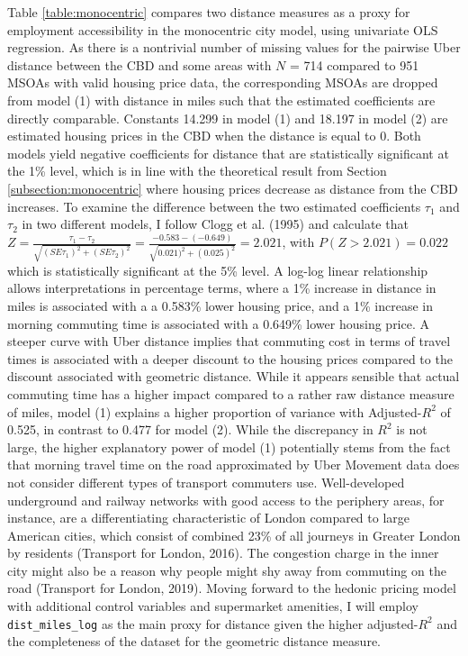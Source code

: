 \documentclass{article}
\begin{document}
Table \ref{table:monocentric} compares two distance measures as a proxy for employment accessibility in the monocentric city model, using univariate OLS regression. As there is a nontrivial number of missing values for the pairwise Uber distance between the CBD and some areas with $N$ = 714 compared to 951 MSOAs with valid housing price data, the corresponding MSOAs are dropped from model (1) with distance in miles such that the estimated coefficients are directly comparable. Constants 14.299 in model (1) and 18.197 in model (2) are estimated housing prices in the CBD when the distance is equal to 0. Both models yield negative coefficients for distance that are statistically significant at the 1\% level, which is in line with the theoretical result from Section \ref{subsection:monocentric} where housing prices decrease as distance from the CBD increases. To examine the difference between the two estimated coefficients $\tau_1$ and $\tau_2$ in two different models, I follow Clogg et al. (1995) and calculate that $Z = \frac{\tau_1 - \tau_2}{\sqrt{(SE\tau_1)^2 + (SE\tau_2)^2}}  = \frac{-0.583 - (-0.649)}{\sqrt{0.021)^2 + (0.025)^2}} = 2.021$, with $P(Z > 2.021) = 0.022$  which is statistically significant at the 5\% level. A log-log linear relationship allows interpretations in percentage terms, where a 1\% increase in distance in miles is associated with a a 0.583\% lower housing price, and a 1\% increase in morning commuting time is associated with a 0.649\% lower housing price.  A steeper curve with Uber distance implies that commuting cost in terms of travel times is associated with a deeper discount to the housing prices compared to the discount associated with geometric distance. While it appears sensible that actual commuting time has a higher impact compared to a rather raw distance measure of miles, model (1) explains a higher proportion of variance with Adjusted-$R^2$ of 0.525, in contrast to 0.477 for model (2). While the discrepancy in $R^2$ is not large, the higher explanatory power of model (1) potentially stems from the fact that morning travel time on the road approximated by Uber Movement data does not consider different types of transport commuters use. Well-developed underground and railway networks with good access to the periphery areas, for instance, are a differentiating characteristic of London compared to large American cities, which consist of combined 23\% of all journeys in Greater London by residents (Transport for London, 2016). The congestion charge in the inner city might also be a reason why people might shy away from commuting on the road (Transport for London, 2019). Moving forward to the hedonic pricing model with additional control variables and supermarket amenities, I will employ \texttt{dist\_miles\_log} as the main proxy for distance given the higher adjusted-$R^2$ and the completeness of the dataset for the geometric distance measure.
\end{document}
